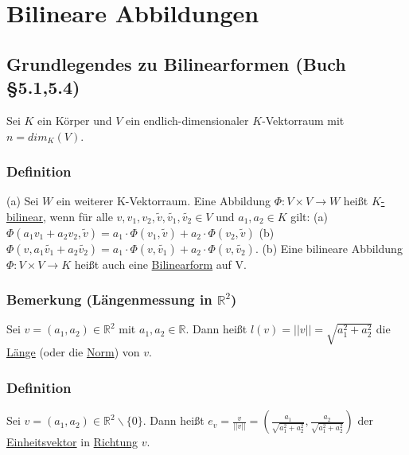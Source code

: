 \documentclass[a4paper]{article}
\newcommand{\ul}{\underline}
\begin{document}
\section{Bilineare Abbildungen}
\setcounter{subsection}{24}
\subsection{Grundlegendes zu Bilinearformen (Buch §5.1,5.4)}
Sei \(K\) ein Körper und \(V\) ein endlich-dimensionaler \(K\)-Vektorraum mit \(n=dim_K(V)\).
\subsubsection{Definition}
(a) Sei \(W\) ein weiterer K-Vektorraum. Eine Abbildung \(\Phi:V\times V\rightarrow W\) heißt \ul{\(K\)-bilinear}, wenn für alle \(v,v_1,v_2,\tilde{v}, \tilde{v_1}, \tilde{v_2} \in V\) und \(a_1, a_2\in K\) gilt:
(a)\(\Phi(a_1v_1+a_2v_2,\tilde{v})=a_1\cdot\Phi(v_1,\tilde{v})+a_2\cdot\Phi(v_2,\tilde{v})\)
(b) \(\Phi(v,a_1\tilde{v_1}+a_2\tilde{v_2})=a_1\cdot\Phi(v,\tilde{v_1})+a_2\cdot\Phi(v,\tilde{v_2})\).
(b) Eine bilineare Abbildung \(\Phi:V\times V\rightarrow K\) heißt auch eine \ul{Bilinearform} auf V.
\subsubsection{Bemerkung (Längenmessung in \(\mathbb{R}^2\))}
Sei \(v=(a_1,a_2)\in\mathbb{R}^2\) mit \(a_1,a_2\in\mathbb{R}\). Dann heißt \(l(v)=||v|| = \sqrt{a_1^2+a_2^2}\) die \ul{Länge} (oder die \ul{Norm}) von \(v\).
\subsubsection{Definition}
Sei \(v=(a_1,a_2)\in\mathbb{R}^2\backslash\{0\}\). Dann heißt \(e_v=\frac{v}{||v||}=(\frac{a_1}{\sqrt{a_1^2+a_2^2}},\frac{a_2}{\sqrt{a_1^2+a_2^2}})\) der \ul{Einheitsvektor} in \ul{Richtung} \(v\).
\end{document}
